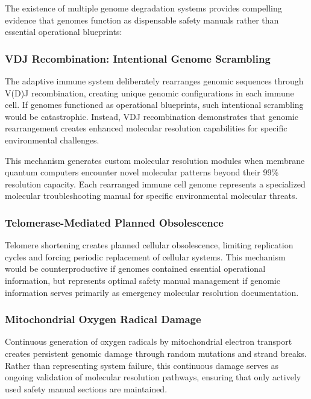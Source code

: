 \documentclass[12pt,a4paper]{article}
\begin{document}
The existence of multiple genome degradation systems provides compelling evidence that genomes function as dispensable safety manuals rather than essential operational blueprints:

\subsubsection{VDJ Recombination: Intentional Genome Scrambling}

The adaptive immune system deliberately rearranges genomic sequences through V(D)J recombination, creating unique genomic configurations in each immune cell. If genomes functioned as operational blueprints, such intentional scrambling would be catastrophic. Instead, VDJ recombination demonstrates that genomic rearrangement creates enhanced molecular resolution capabilities for specific environmental challenges.

This mechanism generates custom molecular resolution modules when membrane quantum computers encounter novel molecular patterns beyond their 99\% resolution capacity. Each rearranged immune cell genome represents a specialized molecular troubleshooting manual for specific environmental molecular threats.

\subsubsection{Telomerase-Mediated Planned Obsolescence}

Telomere shortening creates planned cellular obsolescence, limiting replication cycles and forcing periodic replacement of cellular systems. This mechanism would be counterproductive if genomes contained essential operational information, but represents optimal safety manual management if genomic information serves primarily as emergency molecular resolution documentation.

\subsubsection{Mitochondrial Oxygen Radical Damage}

Continuous generation of oxygen radicals by mitochondrial electron transport creates persistent genomic damage through random mutations and strand breaks. Rather than representing system failure, this continuous damage serves as ongoing validation of molecular resolution pathways, ensuring that only actively used safety manual sections are maintained.
\end{document}
